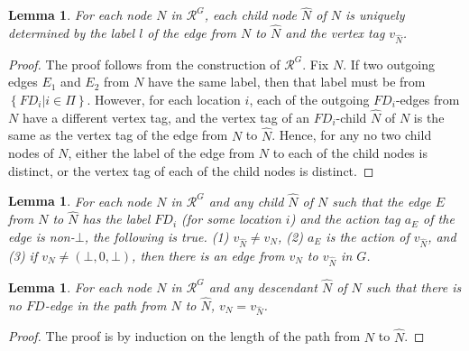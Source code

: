 \documentclass[11pt]{article}
\numberwithin{theorem}{section}
\newtheorem{lemma}[theorem]{Lemma}
\newcommand{\set}[1]{\left\{#1\right\}}
\begin{document}
\begin{lemma}\label{lem:childNodeUniqueByLabelAndVertexTag}
For each node $N$ in $\mathcal{R}^G$, each child node $\hat{N}$ of $N$ is uniquely determined by the label $l$ of the edge from $N$ to $\hat{N}$ and the vertex tag $v_{\hat{N}}$.
\end{lemma}
\begin{proof}
The proof follows from the construction of $\mathcal{R}^G$. Fix $N$. If two outgoing edges $E_1$ and $E_2$ from $N$ have the same label, then that label must be from $\set{FD_i | i\in \Pi}$. However, for each location $i$, each of the outgoing $FD_i$-edges from $N$ have a different vertex tag, and the vertex tag of an  $FD_i$-child $\hat{N}$ of $N$ is the same as the vertex tag of the edge from $N$ to $\hat{N}$. Hence, for any no two child nodes of $N$, either the label of the edge from $N$ to each of the child nodes is distinct, or the vertex tag of each of the child nodes is distinct. 
\end{proof} 

\begin{lemma}\label{prop:FDchildVertexEdgeExists}
For each node $N$ in $\mathcal{R}^G$ and any child $\hat{N}$ of $N$ such that the edge $E$ from $N$ to
$\hat{N}$ has the label $FD_i$ (for some location $i$) and the action tag $a_E$ of the edge is non-$\bot$, the following
is true. (1) $v_{\hat{N}} \neq v_N$, (2) $a_E$ is the action of $v_{\hat{N}}$, and (3) if $v_N \neq (\bot, 0, \bot)$, then there is an edge
from $v_N$ to $v_{\hat{N}}$ in $G$.
\end{lemma}

\begin{lemma}\label{prop:sameVertexTag}
For each node $N$ in $\mathcal{R}^{G}$ and any descendant $\hat{N}$ of $N$ such that there is no $FD$-edge in the path from $N$ to $\hat{N}$, $v_N = v_{\hat{N}}$.
\end{lemma}
\begin{proof}
The proof is by induction on the length of the path from $N$ to $\hat{N}$.
\end{proof}
\end{document}
